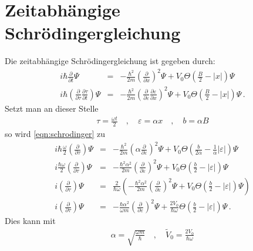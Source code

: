 \maketitle
\section{Zeitabhängige Schrödingergleichung} 
Die zeitabhängige Schrödingergleichung ist gegeben durch:
\begin{eqnarray}
i\hbar\frac{\partial}{\partial t}\Psi
&=&\label{eqn:schrodinger}
-\frac{\hbar^2}{2m}\left(
\frac{\partial}{\partial x}\right)^2
\Psi
+V_0\Theta\left(\frac{B}{2}-\left|x\right|\right)\Psi
\\
i\hbar\left(\frac{\partial}{\partial \tau}\frac{\partial \tau}{\partial t}\right)\Psi
&=&
-\frac{\hbar^2}{2m}\left(
\frac{\partial}{\partial \varepsilon}\frac{\partial \varepsilon}{\partial x}\right)^2
\Psi
+V_0\Theta\left(\frac{B}{2}-\left|x\right|\right)\Psi\,.
\end{eqnarray}
Setzt man an dieser Stelle 
\begin{eqnarray}
\tau=\frac{\omega t}{2}\quad,\quad\varepsilon=\alpha x\quad,\quad
b=\alpha B
\end{eqnarray}
so wird \eqref{eqn:schrodinger} zu 
\begin{eqnarray}
i\hbar\frac{\omega}{2}\left(\frac{\partial}{\partial \tau}\right)\Psi
&=&
-\frac{\hbar^2}{2m}\left(\alpha
\frac{\partial}{\partial \varepsilon}\right)^2
\Psi
+V_0\Theta\left(\frac{b}{2\alpha}-\frac{1}{\alpha}\left|\varepsilon\right|\right)\Psi
\\
i\frac{\hbar\omega}{2}\left(\frac{\partial}{\partial \tau}\right)\Psi
&=&
-\frac{\hbar^2 \alpha^2}{2m}\left(
\frac{\partial}{\partial \varepsilon}\right)^2
\Psi
+V_0\Theta\left(\frac{b}{2}-\left|\varepsilon\right|\right)\Psi
\\
i\left(\frac{\partial}{\partial \tau}\right)\Psi
&=&\frac{2}{\hbar\omega}\left(
-\frac{\hbar^2 \alpha^2}{2m}\left(
\frac{\partial}{\partial \varepsilon}\right)^2
\Psi
+V_0\Theta\left(\frac{b}{2}-\left|\varepsilon\right|\right)\Psi
\right)
\\
i\left(\frac{\partial}{\partial \tau}\right)\Psi
&=&
-\frac{\hbar \alpha^2}{\omega m}\left(
\frac{\partial}{\partial \varepsilon}\right)^2
\Psi
+\frac{2 V_0}{\hbar\omega}\Theta\left(\frac{b}{2}-\left|\varepsilon\right|\right)\Psi\,.
\end{eqnarray}
Dies kann mit 
\begin{eqnarray}
\alpha=\sqrt{\frac{\omega m}{\hbar}}\quad,\quad
\tilde{V}_0=\frac{2V_0}{\hbar \omega}
\end{eqnarray}
